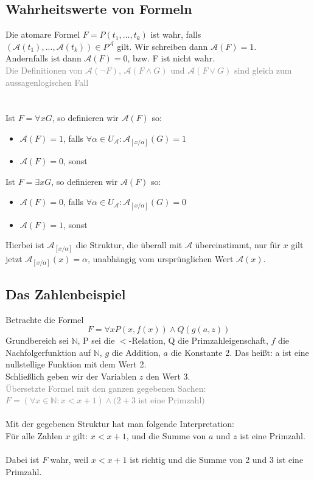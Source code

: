 \documentclass{article}
\begin{document}
	\subsection{Wahrheitswerte von Formeln}
	Die atomare Formel $F = P(t_1, ..., t_k)$ ist wahr, falls $(\mathcal{A}(t_1),...,\mathcal{A}(t_k)) \in P^\mathcal{A}$ gilt. Wir schreiben dann $\mathcal{A}(F) = 1$. \\
	Andernfalls ist dann $\mathcal{A}(F) = 0$, bzw. F ist nicht wahr. \\
	\textcolor{gray}{
		Die Definitionen von $\mathcal{A}(\neg F)$, $\mathcal{A}(F \wedge G)$ und $\mathcal{A}(F \vee G)$ sind gleich zum aussagenlogischen Fall
	} \\
	\\
	\\
	Ist $F= \forall x G$, so definieren wir $\mathcal{A}(F)$ so: 
	\begin{itemize}
		\item $\mathcal{A}(F) = 1$, falls $\forall \alpha \in U_\mathcal{A}: \mathcal{A}_{[x/\alpha]}(G) = 1$
		\item $\mathcal{A}(F) = 0$, sonst
	\end{itemize}
	Ist $F= \exists x G$, so definieren wir $\mathcal{A}(F)$ so: 
	\begin{itemize}
		\item $\mathcal{A}(F) = 0$, falls $\forall \alpha \in U_\mathcal{A}: \mathcal{A}_{[x/\alpha]}(G) = 0$
		\item $\mathcal{A}(F) = 1$, sonst
	\end{itemize}
	Hierbei ist $\mathcal{A}_{[x/\alpha]}$ die Struktur, die überall mit $\mathcal{A}$ übereinstimmt, nur für $x$ gilt jetzt $\mathcal{A}_{[x/\alpha]}(x) = \alpha$, unabhängig vom ursprünglichen Wert $\mathcal{A}(x)$.
	\subsection{Das Zahlenbeispiel}
	Betrachte die Formel
	\[F = \forall x P(x,f(x)) \wedge Q(g(a,z))\]
	Grundbereich sei $\mathbb{N}$, P sei die $<$-Relation, Q die Primzahleigenschaft, $f$ die Nachfolgerfunktion auf $\mathbb{N}$, $g$ die Addition, $a$ die Konstante 2.
	Das heißt: a ist eine nullstellige Funktion mit dem Wert 2. \\
	Schließlich geben wir der Variablen $z$ den Wert 3. \\
	\textcolor{gray}{Übersetzte Formel mit den ganzen gegebenen Sachen: \\
	  $F = (\forall x \in \mathbb{N}: x < x+1) \wedge (2+3$ ist eine  Primzahl$)$	
	}\\
	\\
	Mit der gegebenen Struktur hat man folgende Interpretation: \\
	Für alle Zahlen $x$ gilt: $x < x+1$, und die Summe von $a$ und $z$ ist eine Primzahl. \\
	\\
	Dabei ist $F$ wahr, weil $x < x+1$ ist richtig und die Summe von 2 und 3 ist eine Primzahl. 
\end{document}
